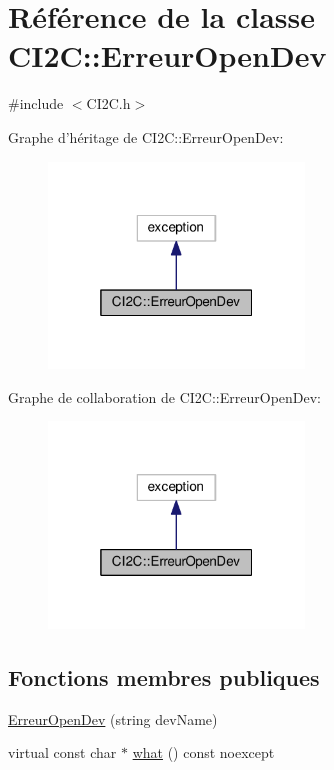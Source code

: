\hypertarget{class_c_i2_c_1_1_erreur_open_dev}{\section{Référence de la classe C\+I2\+C\+:\+:Erreur\+Open\+Dev}
\label{class_c_i2_c_1_1_erreur_open_dev}
}


{\ttfamily \#include $<$C\+I2\+C.\+h$>$}



Graphe d'héritage de C\+I2\+C\+:\+:Erreur\+Open\+Dev\+:
\nopagebreak
\begin{figure}[H]
\begin{center}
\leavevmode
\includegraphics[width=193pt]{class_c_i2_c_1_1_erreur_open_dev__inherit__graph}
\end{center}
\end{figure}


Graphe de collaboration de C\+I2\+C\+:\+:Erreur\+Open\+Dev\+:
\nopagebreak
\begin{figure}[H]
\begin{center}
\leavevmode
\includegraphics[width=193pt]{class_c_i2_c_1_1_erreur_open_dev__coll__graph}
\end{center}
\end{figure}
\subsection*{Fonctions membres publiques}
\begin{DoxyCompactItemize}
\item 
\hyperlink{class_c_i2_c_1_1_erreur_open_dev_ac741480179a06b9d23f4c5c49500a5e1}{Erreur\+Open\+Dev} (string dev\+Name)
\item 
virtual const char $\ast$ \hyperlink{class_c_i2_c_1_1_erreur_open_dev_a52441e7b0de2a74dd51c67504bb93fe1}{what} () const noexcept
\end{DoxyCompactItemize}
